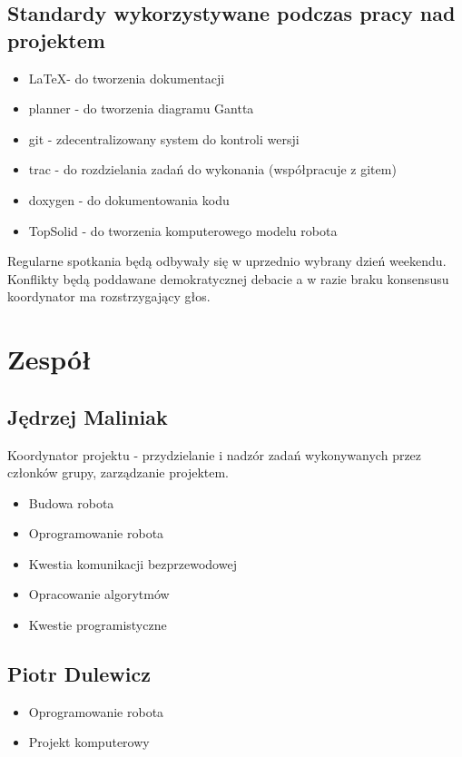 \documentclass[a4paper]{article}
\begin{document}
    \subsection{Standardy wykorzystywane podczas pracy nad projektem}
    \begin{itemize}
        \item \LaTeX - do tworzenia dokumentacji
        \item planner - do tworzenia diagramu Gantta
        \item git - zdecentralizowany system do kontroli wersji
        \item trac - do rozdzielania zadań do wykonania (współpracuje z gitem)
        \item doxygen - do dokumentowania kodu
        \item TopSolid - do tworzenia komputerowego modelu robota
    \end{itemize}
    Regularne spotkania będą odbywały się w uprzednio wybrany dzień weekendu. Konflikty będą poddawane demokratycznej debacie a w razie braku konsensusu koordynator ma rozstrzygający głos.
\section{Zespół}
    \subsection{Jędrzej Maliniak}
    Koordynator projektu - przydzielanie i nadzór zadań wykonywanych przez członków grupy, zarządzanie projektem.
        \begin{itemize}
            \item Budowa robota
            \item Oprogramowanie robota
            \item Kwestia komunikacji bezprzewodowej
            \item Opracowanie algorytmów
            \item Kwestie programistyczne
        \end{itemize}
    \subsection{Piotr Dulewicz}
        \begin{itemize}
            \item Oprogramowanie robota
            \item Projekt komputerowy
        \end{itemize}
\end{document}
